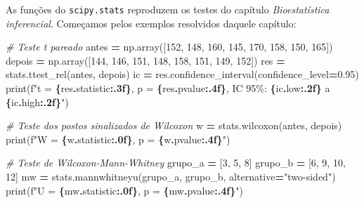 \documentclass[
]{book}
\newenvironment{Shaded}{\begin{snugshade}}{\end{snugshade}}
\newcommand{\BuiltInTok}[1]{#1}
\newcommand{\CommentTok}[1]{\textcolor[rgb]{0.56,0.35,0.01}{\textit{#1}}}
\newcommand{\DecValTok}[1]{\textcolor[rgb]{0.00,0.00,0.81}{#1}}
\newcommand{\FloatTok}[1]{\textcolor[rgb]{0.00,0.00,0.81}{#1}}
\newcommand{\NormalTok}[1]{#1}
\newcommand{\OperatorTok}[1]{\textcolor[rgb]{0.81,0.36,0.00}{\textbf{#1}}}
\newcommand{\SpecialCharTok}[1]{\textcolor[rgb]{0.81,0.36,0.00}{\textbf{#1}}}
\newcommand{\SpecialStringTok}[1]{\textcolor[rgb]{0.31,0.60,0.02}{#1}}
\newcommand{\StringTok}[1]{\textcolor[rgb]{0.31,0.60,0.02}{#1}}
\begin{document}
As funções do \texttt{scipy.stats} reproduzem os testes do capítulo \emph{Bioestatística inferencial}. Começamos pelos exemplos resolvidos daquele capítulo:

\begin{Shaded}
\begin{Highlighting}[]
\CommentTok{\# Teste t pareado}
\NormalTok{antes }\OperatorTok{=}\NormalTok{ np.array([}\DecValTok{152}\NormalTok{, }\DecValTok{148}\NormalTok{, }\DecValTok{160}\NormalTok{, }\DecValTok{145}\NormalTok{, }\DecValTok{170}\NormalTok{, }\DecValTok{158}\NormalTok{, }\DecValTok{150}\NormalTok{, }\DecValTok{165}\NormalTok{])}
\NormalTok{depois }\OperatorTok{=}\NormalTok{ np.array([}\DecValTok{144}\NormalTok{, }\DecValTok{146}\NormalTok{, }\DecValTok{151}\NormalTok{, }\DecValTok{148}\NormalTok{, }\DecValTok{158}\NormalTok{, }\DecValTok{151}\NormalTok{, }\DecValTok{149}\NormalTok{, }\DecValTok{152}\NormalTok{])}
\NormalTok{res }\OperatorTok{=}\NormalTok{ stats.ttest\_rel(antes, depois)}
\NormalTok{ic }\OperatorTok{=}\NormalTok{ res.confidence\_interval(confidence\_level}\OperatorTok{=}\FloatTok{0.95}\NormalTok{)}
\BuiltInTok{print}\NormalTok{(}\SpecialStringTok{f"t = }\SpecialCharTok{\{}\NormalTok{res}\SpecialCharTok{.}\NormalTok{statistic}\SpecialCharTok{:.3f\}}\SpecialStringTok{, p = }\SpecialCharTok{\{}\NormalTok{res}\SpecialCharTok{.}\NormalTok{pvalue}\SpecialCharTok{:.4f\}}\SpecialStringTok{, IC 95\%: }\SpecialCharTok{\{}\NormalTok{ic}\SpecialCharTok{.}\NormalTok{low}\SpecialCharTok{:.2f\}}\SpecialStringTok{ a }\SpecialCharTok{\{}\NormalTok{ic}\SpecialCharTok{.}\NormalTok{high}\SpecialCharTok{:.2f\}}\SpecialStringTok{"}\NormalTok{)}

\CommentTok{\# Teste dos postos sinalizados de Wilcoxon}
\NormalTok{w }\OperatorTok{=}\NormalTok{ stats.wilcoxon(antes, depois)}
\BuiltInTok{print}\NormalTok{(}\SpecialStringTok{f"W = }\SpecialCharTok{\{}\NormalTok{w}\SpecialCharTok{.}\NormalTok{statistic}\SpecialCharTok{:.0f\}}\SpecialStringTok{, p = }\SpecialCharTok{\{}\NormalTok{w}\SpecialCharTok{.}\NormalTok{pvalue}\SpecialCharTok{:.4f\}}\SpecialStringTok{"}\NormalTok{)}

\CommentTok{\# Teste de Wilcoxon{-}Mann{-}Whitney}
\NormalTok{grupo\_a }\OperatorTok{=}\NormalTok{ [}\DecValTok{3}\NormalTok{, }\DecValTok{5}\NormalTok{, }\DecValTok{8}\NormalTok{]}
\NormalTok{grupo\_b }\OperatorTok{=}\NormalTok{ [}\DecValTok{6}\NormalTok{, }\DecValTok{9}\NormalTok{, }\DecValTok{10}\NormalTok{, }\DecValTok{12}\NormalTok{]}
\NormalTok{mw }\OperatorTok{=}\NormalTok{ stats.mannwhitneyu(grupo\_a, grupo\_b, alternative}\OperatorTok{=}\StringTok{"two{-}sided"}\NormalTok{)}
\BuiltInTok{print}\NormalTok{(}\SpecialStringTok{f"U = }\SpecialCharTok{\{}\NormalTok{mw}\SpecialCharTok{.}\NormalTok{statistic}\SpecialCharTok{:.0f\}}\SpecialStringTok{, p = }\SpecialCharTok{\{}\NormalTok{mw}\SpecialCharTok{.}\NormalTok{pvalue}\SpecialCharTok{:.4f\}}\SpecialStringTok{"}\NormalTok{)}
\end{Highlighting}
\end{Shaded}
\end{document}
